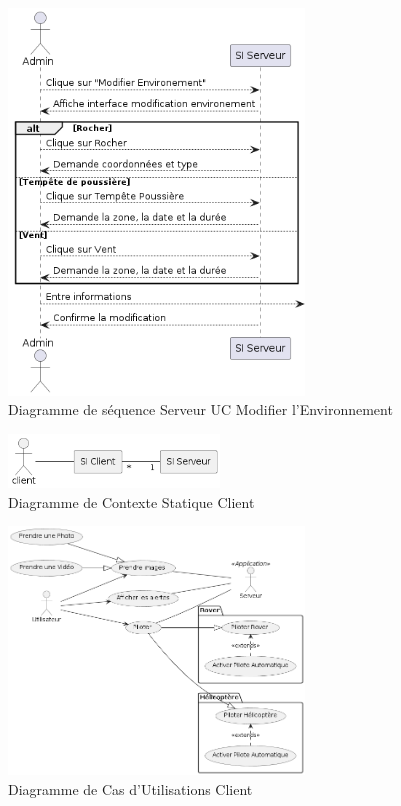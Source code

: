 \documentclass[12pt,a4paper]{scrartcl}
\begin{document}
\begin{figure}[p]
    \centering
    \includegraphics[width=0.7\textwidth]{diag_seq_admin_modif.png}
    \caption{Diagramme de séquence Serveur UC Modifier l'Environnement }\label{seq2_serv}
\end{figure}


\begin{figure}[p]
    \centering
    \includegraphics[width=0.5\textwidth]{Diag_CS_User.png}
    \caption{Diagramme de Contexte Statique Client }\label{cs_client}
\end{figure}

\begin{figure}[p]
    \centering
    \includegraphics[width=0.7\textwidth]{diag_uc_client.png}
    \caption{Diagramme de Cas d'Utilisations Client }\label{uc_client}
\end{figure}
\end{document}
